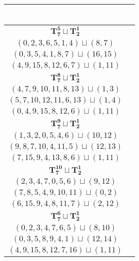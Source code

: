 \documentclass{article}
\begin{document}
\begin{longtable}{|c|c|}
\begin{tabular}{c}
        \end{tabular} \\ 
        \hline
        $\mathbf{T_{7}^{5}} \sqcup \mathbf{T_{2}^{1}}$ & \begin{tabular}{c}
        $(2,4,6,9,12,8,7)\sqcup(11,14)$ \\ 
        $(0,2,3,6,5,1,4)\sqcup(8,7)$ \\ 
        $(0,3,5,4,1,8,7)\sqcup(16,15)$ \\ 
        $(4,9,15,8,12,6,7)\sqcup(1,11)$
        \end{tabular} \\ 
        \hline
        $\mathbf{T_{7}^{8}} \sqcup \mathbf{T_{2}^{1}}$ & \begin{tabular}{c}
        $(1,2,4,6,8,5,9)\sqcup(12,15)$ \\ 
        $(4,7,9,10,11,8,13)\sqcup(1,3)$ \\ 
        $(5,7,10,12,11,6,13)\sqcup(1,4)$ \\ 
        $(0,4,9,15,8,12,6)\sqcup(1,11)$
        \end{tabular} \\ 
        \hline
        $\mathbf{T_{7}^{9}} \sqcup \mathbf{T_{2}^{1}}$ & \begin{tabular}{c}
        $(8,6,4,2,5,9,7)\sqcup(12,14)$ \\ 
        $(1,3,2,0,5,4,6)\sqcup(10,12)$ \\ 
        $(9,8,7,10,4,11,5)\sqcup(12,13)$ \\ 
        $(7,15,9,4,13,8,6)\sqcup(1,11)$
        \end{tabular} \\ 
        \hline
        $\mathbf{T_{7}^{10}} \sqcup \mathbf{T_{2}^{1}}$ & \begin{tabular}{c}
        $(7,6,4,2,8,9,5)\sqcup(12,14)$ \\ 
        $(2,3,4,7,0,5,6)\sqcup(9,12)$ \\ 
        $(7,8,5,4,9,10,11)\sqcup(0,2)$ \\ 
        $(6,15,9,4,8,11,7)\sqcup(2,12)$
        \end{tabular} \\ 
        \hline
        $\mathbf{T_{7}^{6}} \sqcup \mathbf{T_{2}^{1}}$ & \begin{tabular}{c}
        $(2,4,6,8,7,9,12)\sqcup(13,14)$ \\ 
        $(0,2,3,4,7,6,5)\sqcup(8,10)$ \\ 
        $(0,3,5,8,9,4,1)\sqcup(12,14)$ \\ 
        $(4,9,15,8,12,7,16)\sqcup(1,11)$

\end{tabular}
\end{longtable}
\end{document}
